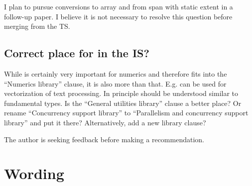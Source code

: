 I plan to pursue conversions to array and from span with static extent in a follow-up paper.
I believe it is not necessary to resolve this question before merging  from the TS.

\subsection{Correct place for  in the IS?}

While  is certainly very important for numerics and therefore fits into the “Numerics library” clause, it is also more than that.
E.g.  can be used for vectorization of text processing.
In principle  should be understood similar to fundamental types.
Is the “General utilities library” clause a better place?
Or rename “Concurrency support library” to “Parallelism and concurrency support library” and put it there?
Alternatively, add a new library clause?

The author is seeking feedback before making a recommendation.

\section{Wording}





